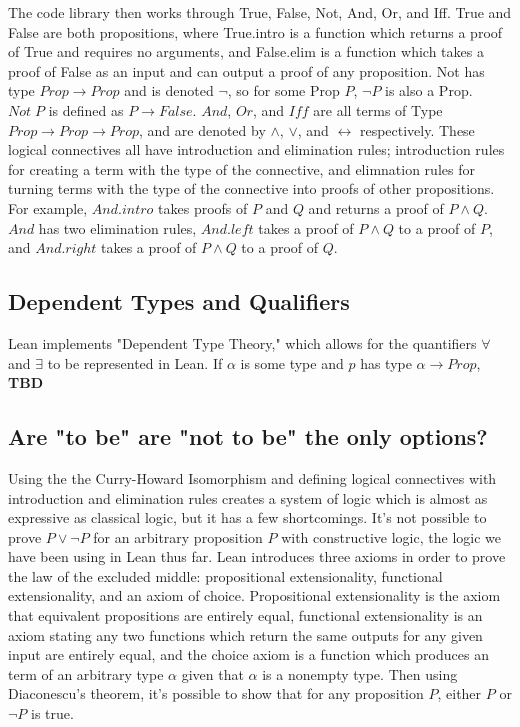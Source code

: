 The code library then works through True, False, Not, And, Or, and Iff.
True and False are both propositions, where True.intro is a function which
returns a proof of True and requires no arguments, and False.elim is a function
which takes a proof of False as an input and can output a proof of any
proposition. Not has type $Prop \to Prop$ and is denoted $\lnot$, so for
some Prop $P$, $\lnot P$ is also a Prop. $Not\;P$ is defined as
$P\to False$. $And$, $Or$, and $Iff$ are all terms of Type 
$Prop\to Prop\to Prop$, and are denoted by 
$\wedge$, $\vee$, and $\leftrightarrow$ respectively. These logical connectives
all have introduction and elimination rules; introduction rules for
creating a term with the type of the connective, and elimnation rules for
turning terms with the type of the connective into proofs of other propositions.
For example, $And.intro$ takes proofs of $P$ and $Q$ and returns a proof of
$P\wedge Q$. $And$ has two elimination rules, $And.left$ takes a proof
of $P\wedge Q$ to a proof of $P$, and $And.right$ takes a proof of 
$P\wedge Q$ to a proof of $Q$. 

\subsection{Dependent Types and Qualifiers}

Lean implements "Dependent Type Theory," which allows for the quantifiers
$\forall$ and $\exists$ to be represented in Lean. If $\alpha$ is some
type and $p$ has type $\alpha\to Prop$, \textbf{TBD}

\subsection{Are "to be" are "not to be" the only options?}

Using the the Curry-Howard Isomorphism and defining logical connectives
with introduction and elimination rules creates a system of logic which
is almost as expressive as classical logic, but it has a few shortcomings.
It's not possible to prove $P\vee\lnot P$ for an arbitrary proposition $P$
with constructive logic, the logic we have been using in Lean thus far.
Lean introduces three axioms in order to prove the law of the
excluded middle: propositional extensionality, functional
extensionality, and an axiom of choice. Propositional extensionality is the
axiom that equivalent propositions are entirely equal, functional extensionality
is an axiom stating any two functions which return the same outputs for any
given input are entirely equal, and the choice axiom is a function which produces
an term of an arbitrary type $\alpha$ given that $\alpha$ is a nonempty
type. Then using Diaconescu's theorem, it's possible to show that for any
proposition $P$, either $P$ or $\lnot P$ is true. 


